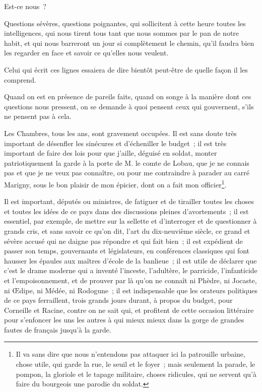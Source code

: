 \documentclass[french,twoside]{book} %
\begin{document}
Est-ce nous ?\par
Questions sévères, questions poignantes, qui sollicitent à cette heure toutes les intelligences, qui nous tirent tous tant que nous sommes par le pan de notre habit, et qui nous barreront un jour si complètement le chemin, qu’il faudra bien les regarder en face et savoir ce qu’elles nous veulent.\par
Celui qui écrit ces lignes essaiera de dire bientôt peut-être de quelle façon il les comprend.\par
Quand on est en présence de pareils faits, quand on songe à la manière dont ces questions nous pressent, on se demande à quoi pensent ceux qui gouvernent, s’ils ne pensent pas à cela.\par
 Les Chambres, tous les ans, sont gravement occupées. Il est sans doute très important de désenfler les sinécures et d’écheniller le budget ; il est très important de faire des lois pour que j’aille, déguisé en soldat, monter patriotiquement la garde à la porte de M. le comte de Lobau, que je ne connais pas et que je ne veux pas connaître, ou pour me contraindre à parader au carré Marigny, sous le bon plaisir de mon épicier, dont on a fait mon officier\footnote{ \noindent Il va sans dire que nous n’entendons pas attaquer ici la patrouille urbaine, chose utile, qui garde la rue, le seuil et le foyer ; mais seulement la parade, le pompon, la gloriole et le tapage militaire, choses ridicules, qui ne servent qu’à faire du bourgeois une parodie du soldat.
 }.\par
Il est important, députés ou ministres, de fatiguer et de tirailler toutes les choses et toutes les idées de ce pays dans des discussions pleines d’avortements ; il est essentiel, par exemple, de mettre sur la sellette et d’interroger et de questionner à grands cris, et sans savoir ce qu’on dit, l’art du dix-neuvième siècle, ce grand et sévère accusé qui ne daigne pas répondre et qui fait bien ; il est expédient de passer son temps, gouvernants et législateurs, en conférences classiques qui font hausser les épaules aux maîtres d’école de la banlieue ; il est utile de déclarer que c’est le drame moderne qui a inventé l’inceste, l’adultère, le parricide, l’infanticide et l’empoisonnement, et de prouver par là qu’on ne connaît ni Phèdre, ni Jocaste, ni Œdipe, ni Médée, ni Rodogune ; il est indispensable que les orateurs politiques de ce pays ferraillent, trois grands jours durant, à propos du budget, pour  Corneille et Racine, contre on ne sait qui, et profitent de cette occasion littéraire pour s’enfoncer les uns les autres à qui mieux mieux dans la gorge de grandes fautes de français jusqu’à la garde.\par
\end{document}
